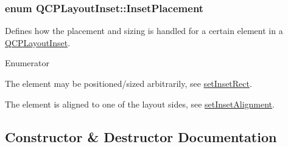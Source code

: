 \subsubsection[{\texorpdfstring{Inset\+Placement}{InsetPlacement}}]{\setlength{\rightskip}{0pt plus 5cm}enum {\bf Q\+C\+P\+Layout\+Inset\+::\+Inset\+Placement}}\hypertarget{classQCPLayoutInset_a8b9e17d9a2768293d2a7d72f5e298192}{}\label{classQCPLayoutInset_a8b9e17d9a2768293d2a7d72f5e298192}
Defines how the placement and sizing is handled for a certain element in a \hyperlink{classQCPLayoutInset}{Q\+C\+P\+Layout\+Inset}. \begin{Desc}
\item[Enumerator]\par
\begin{description}
\item[{\em 
ip\+Free\hypertarget{classQCPLayoutInset_a8b9e17d9a2768293d2a7d72f5e298192aa4802986ea2cea457f932b115acba59e}{}\label{classQCPLayoutInset_a8b9e17d9a2768293d2a7d72f5e298192aa4802986ea2cea457f932b115acba59e}
}]The element may be positioned/sized arbitrarily, see \hyperlink{classQCPLayoutInset_aa487c8378a6f9533567a2e6430099dc3}{set\+Inset\+Rect}. \item[{\em 
ip\+Border\+Aligned\hypertarget{classQCPLayoutInset_a8b9e17d9a2768293d2a7d72f5e298192aa81e7df4a785ddee2229a8f47c46e817}{}\label{classQCPLayoutInset_a8b9e17d9a2768293d2a7d72f5e298192aa81e7df4a785ddee2229a8f47c46e817}
}]The element is aligned to one of the layout sides, see \hyperlink{classQCPLayoutInset_a62882a4f9ad58bb0f53da12fde022abe}{set\+Inset\+Alignment}. \end{description}
\end{Desc}


\subsection{Constructor \& Destructor Documentation}
